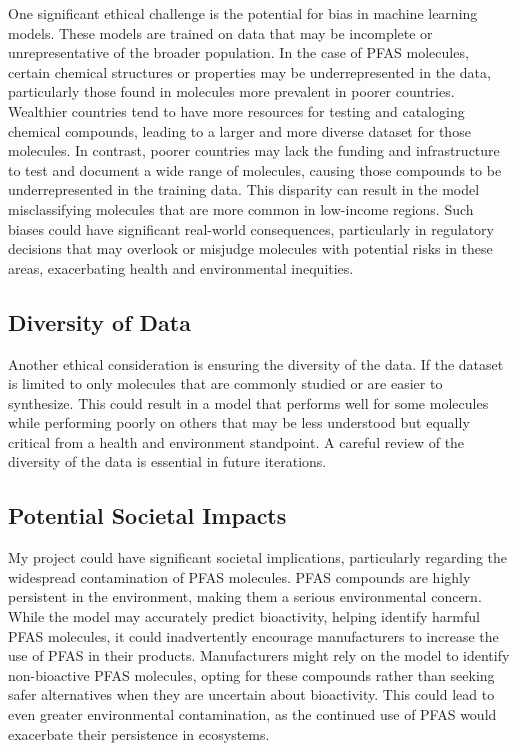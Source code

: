\documentclass[10pt,twocolumn]{article}
\begin{document}
One significant ethical challenge is the potential for bias in machine learning models. These models are trained on data that may be incomplete or unrepresentative of the broader population. In the case of PFAS molecules, certain chemical structures or properties may be underrepresented in the data, particularly those found in molecules more prevalent in poorer countries. Wealthier countries tend to have more resources for testing and cataloging chemical compounds, leading to a larger and more diverse dataset for those molecules. In contrast, poorer countries may lack the funding and infrastructure to test and document a wide range of molecules, causing those compounds to be underrepresented in the training data. This disparity can result in the model misclassifying molecules that are more common in low-income regions. Such biases could have significant real-world consequences, particularly in regulatory decisions that may overlook or misjudge molecules with potential risks in these areas, exacerbating health and environmental inequities.

\subsection{Diversity of Data}

Another ethical consideration is ensuring the diversity of the data. If the dataset is limited to only molecules that are commonly studied or are easier to synthesize. This could result in a model that performs well for some molecules while performing poorly on others that may be less understood but equally critical from a health and environment standpoint. A careful review of the diversity of the data is essential in future iterations. 

\subsection{Potential Societal Impacts}

My project could have significant societal implications, particularly regarding the widespread contamination of PFAS molecules. PFAS compounds are highly persistent in the environment, making them a serious environmental concern. While the model may accurately predict bioactivity, helping identify harmful PFAS molecules, it could inadvertently encourage manufacturers to increase the use of PFAS in their products. Manufacturers might rely on the model to identify non-bioactive PFAS molecules, opting for these compounds rather than seeking safer alternatives when they are uncertain about bioactivity. This could lead to even greater environmental contamination, as the continued use of PFAS would exacerbate their persistence in ecosystems.
\end{document}
